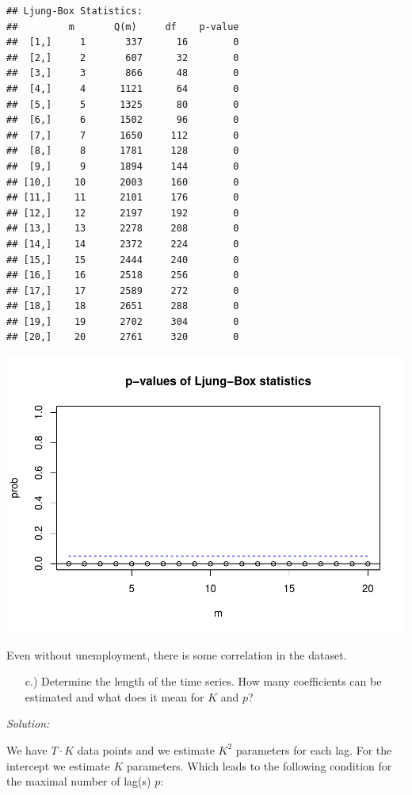 \documentclass[12pt,a4paper]{article}
\begin{document}
\begin{verbatim}
## Ljung-Box Statistics:  
##         m       Q(m)     df    p-value
##  [1,]     1       337      16        0
##  [2,]     2       607      32        0
##  [3,]     3       866      48        0
##  [4,]     4      1121      64        0
##  [5,]     5      1325      80        0
##  [6,]     6      1502      96        0
##  [7,]     7      1650     112        0
##  [8,]     8      1781     128        0
##  [9,]     9      1894     144        0
## [10,]    10      2003     160        0
## [11,]    11      2101     176        0
## [12,]    12      2197     192        0
## [13,]    13      2278     208        0
## [14,]    14      2372     224        0
## [15,]    15      2444     240        0
## [16,]    16      2518     256        0
## [17,]    17      2589     272        0
## [18,]    18      2651     288        0
## [19,]    19      2702     304        0
## [20,]    20      2761     320        0
\end{verbatim}

\includegraphics{solution_exercise_5_files/figure-latex/unnamed-chunk-6-1.pdf}

Even without unemployment, there is some correlation in the dataset.

\begin{itemize}
  \item[c.)] Determine the length of the time series. How many coefficients can be estimated and what does it mean for $K$ and $p$?
\end{itemize}

\emph{Solution:}

We have \(T \cdot K\) data points and we estimate \(K^2\) parameters for
each lag. For the intercept we estimate \(K\) parameters. Which leads to
the following condition for the maximal number of lag(s) \(p\):
\end{document}
